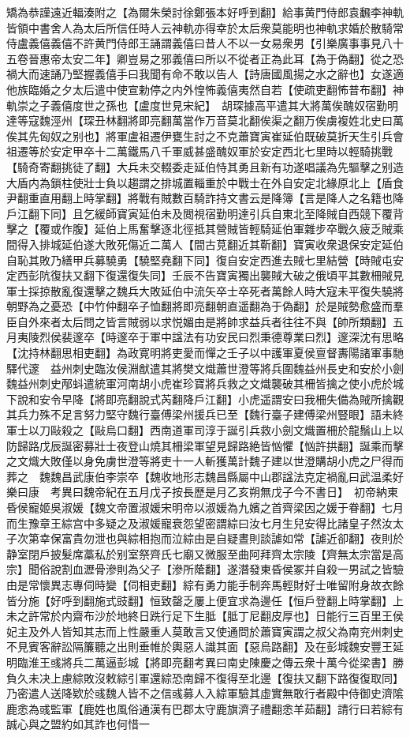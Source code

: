 矯為恭謹遠近輻湊附之【為爾朱榮討徐鄭張本好呼到翻】給事黄門侍郎袁飜李神軌皆領中書舍人為太后所信任時人云神軌亦得幸於太后衆莫能明也神軌求婚於散騎常侍盧義僖義僖不許黄門侍郎王誦謂義僖曰昔人不以一女易衆男【引樂廣事事見八十五卷晉惠帝太安二年】卿豈易之邪義僖曰所以不從者正為此耳【為于偽翻】從之恐禍大而速誦乃堅握義僖手曰我聞有命不敢以告人【詩唐國風揚之水之辭也】女遂適他族臨婚之夕太后遣中使宣勅停之内外惶怖義僖夷然自若【使疏吏翻怖普布翻】神軌崇之子義僖度世之孫也【盧度世見宋紀】　胡琛據高平遣其大將萬俟醜奴宿勤明達等寇魏涇州【琛丑林翻將即亮翻萬當作万音莫北翻俟渠之翻万俟虜複姓北史曰萬俟其先匈奴之别也】將軍盧祖遷伊甕生討之不克蕭寶寅崔延伯既破莫折天生引兵會祖遷等於安定甲卒十二萬鐵馬八千軍威甚盛醜奴軍於安定西北七里時以輕騎挑戰【騎奇寄翻挑徒了翻】大兵未交輟委走延伯恃其勇且新有功遂唱議為先驅擊之别造大盾内為鎖柱使壯士負以趨謂之排城置輜重於中戰士在外自安定北緣原北上【盾食尹翻重直用翻上時掌翻】將戰有賊數百騎詐持文書云是降簿【言是降人之名籍也降戶江翻下同】且乞緩師寶寅延伯未及閲視宿勤明達引兵自東北至降賊自西競下覆背擊之【覆或作腹】延伯上馬奮擊逐北徑抵其營賊皆輕騎延伯軍雜步卒戰久疲乏賊乘間得入排城延伯遂大敗死傷近二萬人【間古莧翻近其靳翻】寶寅收衆退保安定延伯自恥其敗乃繕甲兵募驍勇【驍堅堯翻下同】復自安定西進去賊七里結營【時賊屯安定西彭阬復扶又翻下復還復失同】壬辰不告寶寅獨出襲賊大破之俄頃平其數柵賊見軍士採掠散亂復還擊之魏兵大敗延伯中流矢卒士卒死者萬餘人時大寇未平復失驍將朝野為之憂恐【中竹仲翻卒子恤翻將即亮翻朝直遥翻為于偽翻】於是賊勢愈盛而羣臣自外來者太后問之皆言賊弱以求悦媚由是將帥求益兵者往往不與【帥所類翻】五月夷陵烈侯裴邃卒【時邃卒于軍中諡法有功安民曰烈秉德尊業曰烈】邃深沈有思略【沈持林翻思相吏翻】為政寛明將吏愛而憚之壬子以中護軍夏侯亶督夀陽諸軍事馳驛代邃　益州刺史臨汝侯淵猷遣其將樊文熾蕭世澄等將兵圍魏益州長史和安於小劍魏益州刺史邴蚪遣統軍河南胡小虎崔珍寶將兵救之文熾襲破其柵皆擒之使小虎於城下說和安令早降【將即亮翻說式芮翻降戶江翻】小虎遥謂安曰我柵失備為賊所擒觀其兵力殊不足言努力堅守魏行臺傅梁州援兵已至【魏行臺子建傅梁州豎眼】語未終軍士以刀敺殺之【敺烏口翻】西南道軍司淳于誕引兵救小劍文熾置柵於龍鬚山上以防歸路戊辰誕密募壯士夜登山燒其柵梁軍望見歸路絶皆忷懼【忷許拱翻】誕乘而擊之文熾大敗僅以身免虜世澄等將吏十一人斬獲萬計魏子建以世澄購胡小虎之尸得而葬之　魏魏昌武康伯李崇卒【魏收地形志魏昌縣屬中山郡諡法克定禍亂曰武温柔好樂曰康　考異曰魏帝紀在五月戊子按長歷是月乙亥朔無戊子今不書日】　初帝納東昏侯寵姬吳淑媛【魏文帝置淑媛宋明帝以淑媛為九嬪之首齊梁因之媛于眷翻】七月而生豫章王綜宫中多疑之及淑媛寵衰怨望密謂綜曰汝七月生兒安得比諸皇子然汝太子次第幸保富貴勿泄也與綜相抱而泣綜由是自疑晝則談謔如常【謔近卻翻】夜則於静室閉戶披髮席藁私於别室祭齊氏七廟又微服至曲阿拜齊太宗陵【齊無太宗當是高宗】聞俗說割血瀝骨滲則為父子【滲所䕃翻】遂潛發東昏侯冢并自殺一男試之皆驗由是常懷異志專伺時變【伺相吏翻】綜有勇力能手制奔馬輕財好士唯留附身故衣餘皆分施【好呼到翻施式豉翻】恒致罄乏屢上便宜求為邊任【恒戶登翻上時掌翻】上未之許常於内齋布沙於地終日跣行足下生胝【胝丁尼翻皮厚也】日能行三百里王侯妃主及外人皆知其志而上性嚴重人莫敢言又使通問於蕭寶寅謂之叔父為南兖州刺史不見賓客辭訟隔簾聽之出則垂帷於輿惡人識其面【惡烏路翻】及在彭城魏安豐王延明臨淮王彧將兵二萬逼彭城【將即亮翻考異曰南史陳慶之傳云衆十萬今從梁書】勝負久未决上慮綜敗沒敕綜引軍還綜恐南歸不復得至北邊【復扶又翻下路復復取同】乃密遣人送降欵於彧魏人皆不之信彧募人入綜軍驗其虛實無敢行者殿中侍御史濟隂鹿悆為彧監軍【鹿姓也風俗通漢有巴郡太守鹿旗濟子禮翻悆羊茹翻】請行曰若綜有誠心與之盟約如其詐也何惜一